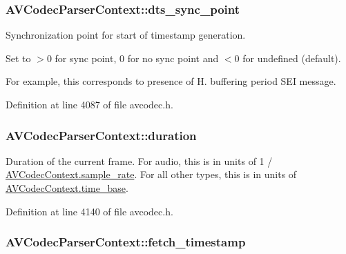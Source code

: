 \subsubsection[{\texorpdfstring{dts\+\_\+sync\+\_\+point}{dts_sync_point}}]{ A\+V\+Codec\+Parser\+Context\+::dts\+\_\+sync\+\_\+point}\hypertarget{struct_a_v_codec_parser_context_af966b95c5e701aacc4feffd678d4e4ba}{}\label{struct_a_v_codec_parser_context_af966b95c5e701aacc4feffd678d4e4ba}
Synchronization point for start of timestamp generation.

Set to $>$0 for sync point, 0 for no sync point and $<$0 for undefined (default).

For example, this corresponds to presence of H. buffering period S\+EI message. 

Definition at line 4087 of file avcodec.\+h.

\subsubsection[{\texorpdfstring{duration}{duration}}]{ A\+V\+Codec\+Parser\+Context\+::duration}\hypertarget{struct_a_v_codec_parser_context_a051e3628c43876e42cfcff99ea0fc44c}{}\label{struct_a_v_codec_parser_context_a051e3628c43876e42cfcff99ea0fc44c}
Duration of the current frame. For audio, this is in units of 1 / \hyperlink{struct_a_v_codec_context_a8ff0b000c463361e234af48d03aadfc0}{A\+V\+Codec\+Context.\+sample\+\_\+rate}. For all other types, this is in units of \hyperlink{struct_a_v_codec_context_ab7bfeb9fa5840aac090e2b0bd0ef7589}{A\+V\+Codec\+Context.\+time\+\_\+base}. 

Definition at line 4140 of file avcodec.\+h.

\subsubsection[{\texorpdfstring{fetch\+\_\+timestamp}{fetch_timestamp}}]{ A\+V\+Codec\+Parser\+Context\+::fetch\+\_\+timestamp}\hypertarget{struct_a_v_codec_parser_context_af4800c3024585bd29852ab15d11588d6}{}\label{struct_a_v_codec_parser_context_af4800c3024585bd29852ab15d11588d6}



